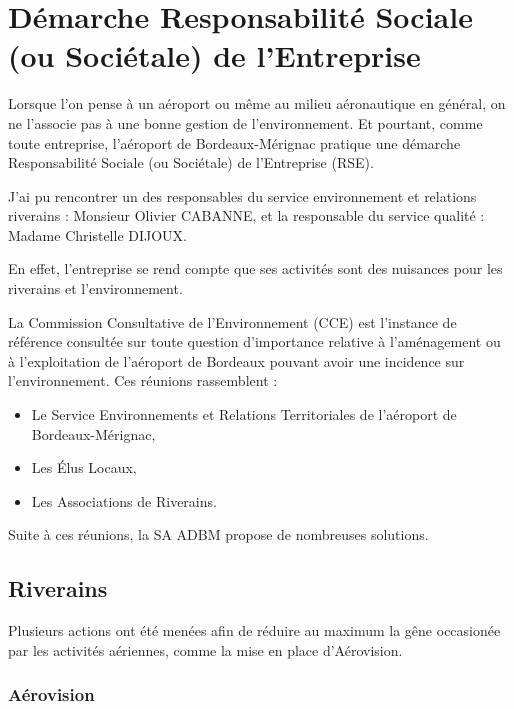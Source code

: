 \newpage

\section{Démarche Responsabilité Sociale (ou Sociétale) de l’Entreprise}


Lorsque l'on pense à un aéroport ou même au milieu aéronautique en général, on ne l'associe pas à une bonne gestion de l'environnement.
Et pourtant, comme toute entreprise, l'aéroport de Bordeaux-Mérignac pratique une démarche Responsabilité Sociale (ou Sociétale) de l'Entreprise (RSE).

J'ai pu rencontrer un des responsables du service environnement et relations riverains : Monsieur Olivier CABANNE, et la responsable du service qualité : Madame Christelle DIJOUX.\newline

En effet, l'entreprise se rend compte que ses activités sont des nuisances pour les riverains et l'environnement. 

La Commission Consultative de l’Environnement (CCE) est l’instance de référence consultée sur toute question d’importance relative à l’aménagement ou à l’exploitation de l’aéroport de Bordeaux pouvant avoir une incidence sur l’environnement. Ces réunions rassemblent : 

\begin{itemize}
  \item Le Service Environnements et Relations Territoriales de l'aéroport de Bordeaux-Mérignac,
  \item Les Élus Locaux,
  \item Les Associations de Riverains.
\end{itemize}

Suite à ces réunions, la SA ADBM propose de nombreuses solutions.\newline

\subsection{Riverains}

Plusieurs actions ont été menées afin de réduire au maximum la gêne occasionée par les activités aériennes, comme la mise en place d'Aérovision.


\subsubsection{Aérovision}

